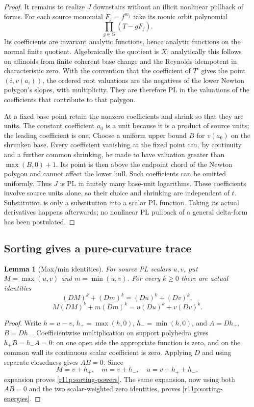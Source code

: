 \documentclass[11pt]{article}
\newtheorem{lemma}[theorem]{Lemma}
\theoremstyle{definition}
\theoremstyle{remark}
\numberwithin{equation}{section}
\begin{document}
\begin{proof}
It remains to realize $J$ downstairs without an illicit nonlinear
pullback of forms.  For each source monomial $F_j=f^{m_j}$ take its monic
orbit polynomial
\[
                          \prod_{g\in G}(T-gF_j).
\]
Its coefficients are invariant analytic functions, hence analytic
functions on the normal finite quotient.  Algebraically the quotient
is $X$; analytically this follows on affinoids from finite coherent
base change and the Reynolds idempotent in characteristic zero.
With the convention that the coefficient of $T^i$ gives the point
$(i,v(a_i))$, the ordered root valuations are the negatives of the
lower Newton polygon's slopes, with multiplicity.  They are therefore
PL in the valuations of the coefficients that contribute to that
polygon.

At a fixed base point retain the nonzero coefficients and shrink so
that they are units.  The constant coefficient $a_0$ is a unit because
it is a product of source units; the leading coefficient is one.
Choose a uniform upper bound $B$ for $v(a_0)$ on the shrunken base.
Every coefficient vanishing at the fixed point can, by continuity and
a further common shrinking, be made to have valuation greater than
$\max(B,0)+1$.  Its point is then above the endpoint chord of the
Newton polygon and cannot affect the lower hull.  Such coefficients
can be omitted uniformly.
Thus $J$ is PL in finitely many base-unit logarithms.  These
coefficients involve source units alone, so their choice and shrinking
are independent of $t$.  Substitution is only a substitution into a
scalar PL function.  Taking its actual derivatives happens afterwards;
no nonlinear PL pullback of a general delta-form has been postulated.
\end{proof}

\subsection{Sorting gives a pure-curvature trace}

\begin{lemma}[Max/min identities]
\label{r11p:sorting}
For source PL scalars $u,v$, put $M=\max(u,v)$ and $m=\min(u,v)$.
For every $k\geq0$ there are actual identities
\[
 (DM)^k+(Dm)^k=(Du)^k+(Dv)^k,
\tag{MT3}\label{r11p:sorting-powers}
\]
\[
 M(DM)^k+m(Dm)^k=u(Du)^k+v(Dv)^k.
\tag{MT4}\label{r11p:sorting-energies}
\]
\end{lemma}

\begin{proof}
Write $h=u-v$, $h_+=\max(h,0)$, $h_-=\min(h,0)$, and
$A=Dh_+$, $B=Dh_-$.  Coefficientwise multiplication on support
polyhedra gives $h_+B=h_-A=0$: on one open side the appropriate
function is zero, and on the common wall its continuous scalar
coefficient is zero.  Applying $D$ and using separate closedness gives
$AB=0$.  Since
\[
 M=v+h_+,\quad m=v+h_-,\quad u=v+h_++h_-,
\]
expansion proves \eqref{r11p:sorting-powers}.  The same expansion,
now using both $AB=0$ and the two scalar-weighted zero identities,
proves \eqref{r11p:sorting-energies}.
\end{proof}
\end{document}
